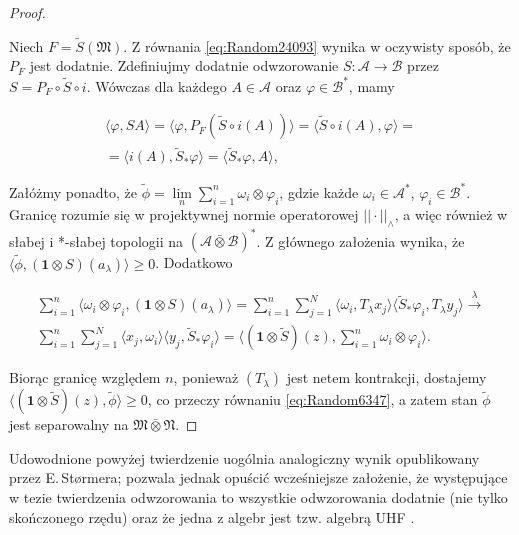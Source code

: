 \begin{proof}
\begin{linenomath*}
\end{linenomath*}
Niech $F = \tilde{S}(\mathfrak{M})$.
Z równania \eqref{eq:Random24093} wynika w oczywisty sposób, że
$P_{F}$ jest dodatnie.
Zdefiniujmy dodatnie odwzorowanie $S: \mathcal{A} \rightarrow \mathcal{B}$ przez
$S = P_{F} \circ \tilde{S} \circ i$.
Wówczas dla każdego $A \in \mathcal{A}$ oraz $\varphi \in \mathcal{B}^{*}$,
mamy
\begin{linenomath*}
 \begin{multline}
\langle \varphi, SA \rangle =
\langle \varphi, P_{F} ( \tilde{S} \circ i (A)) \rangle =
\langle  \tilde{S} \circ i (A), \varphi \rangle = \\
=\langle i(A), \tilde{S}_{*} \varphi \rangle =
\langle \tilde{S}_{*} \varphi, A \rangle,
 \end{multline}
\end{linenomath*}
Załóżmy ponadto, że
$\tilde{\phi} = \lim \limits_{n} \sum_{i=1}^{n}\omega_{i} \otimes \varphi_{i}$,
gdzie każde $\omega_{i} \in \mathcal{A}^{*}$,
$\varphi_{i} \in \mathcal{B}^{*}$.
Granicę rozumie się w projektywnej normie operatorowej $|| \cdot ||_{\wedge}$,
a więc również w słabej i *-słabej topologii na
$(\mathcal{A} \bar{\otimes} \mathcal{B})^{*}$.
Z głównego założenia wynika, że
$\langle \tilde{\phi},(\mathbf{1} \otimes S) (a_{\lambda}) \rangle \geq 0$.
Dodatkowo
\begin{linenomath*}
 \begin{multline}
\sum \limits_{i=1}^{n}\langle \omega_{i} \otimes \varphi_{i},
(\mathbf{1} \otimes S)(a_{\lambda}) \rangle =
\sum \limits_{i=1}^{n} \sum \limits_{j=1}^{N}
\langle \omega_{i} , T_{\lambda} x_{j} \rangle
\langle \tilde{S}_{*} \varphi_{i}, T_{\lambda} y_{j}\rangle
\stackrel{\lambda}{\longrightarrow}\\
\sum \limits_{i=1}^{n} \sum \limits_{j=1}^{N}
\langle  x_{j}, \omega_{i} \rangle\langle  y_{j},  \tilde{S}_{*} \varphi_{i} \rangle =
\langle (\mathbf{1} \otimes \tilde{S})(z),
\sum \limits_{i=1}^{n} \omega_{i} \otimes \varphi_{i} \rangle .
 \end{multline}
\end{linenomath*}
Biorąc granicę względem $n$,
ponieważ $(T_{\lambda})$ jest netem kontrakcji, dostajemy
$\langle (\mathbf{1} \otimes \tilde{S}) (z) ,
\tilde{\phi}\rangle \geq 0$,
co przeczy równaniu \eqref{eq:Random6347},
a zatem stan $\tilde{\phi}$ jest separowalny na
$\mathfrak{M} \bar{\otimes} \mathfrak{N}$.
\end{proof}

Udowodnione powyżej twierdzenie uogólnia analogiczny wynik opublikowany przez
E.\,St{\o}rmera; pozwala jednak opuścić wcześniejsze założenie, że występujące
w tezie twierdzenia odwzorowania to wszystkie odwzorowania dodatnie
(nie tylko skończonego rzędu) oraz że jedna z algebr jest tzw. algebrą
UHF \cite{stormer2009separable}.


